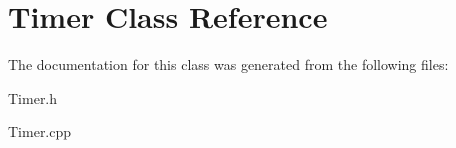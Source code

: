 \hypertarget{class_timer}{}\section{Timer Class Reference}
\label{class_timer}


The documentation for this class was generated from the following files\+:\begin{DoxyCompactItemize}
\item 
Timer.\+h\item 
Timer.\+cpp\end{DoxyCompactItemize}
